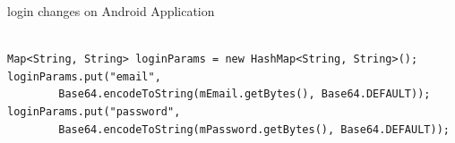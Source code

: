 \begin{algorithm}[h]
  \caption{login changes on Android Application}
  \label{code:android_login}
  \begin{verbatim}
  
Map<String, String> loginParams = new HashMap<String, String>();
loginParams.put("email", 
		Base64.encodeToString(mEmail.getBytes(), Base64.DEFAULT));
loginParams.put("password", 
		Base64.encodeToString(mPassword.getBytes(), Base64.DEFAULT));
 \end{verbatim}
\end{algorithm} 